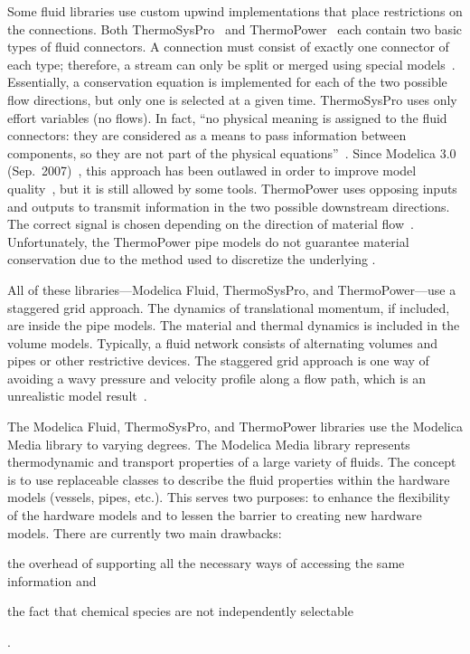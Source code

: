 Some  fluid libraries use custom upwind implementations that place restrictions on the connections.  Both ThermoSysPro~\cite{Hefni2011} and ThermoPower~\cite{Casella2006} each contain two basic types of fluid connectors.  A connection must consist of exactly one connector of each type; therefore, a stream can only be split or merged using special models~\cite{Franke2009}.  Essentially, a conservation equation is implemented for each of the two possible flow directions, but only one is selected at a given time.  ThermoSysPro uses only effort variables (no flows).  In fact, ``no physical meaning is assigned to the fluid connectors: they are considered as a means to pass information between components, so they are not part of the physical equations''~\cite{Hefni2011}.  Since Modelica 3.0 (Sep.\ 2007)~\cite{Modelica3.3}, this approach has been outlawed in order to improve model quality~\cite{Olsson2008}, but it is still allowed by some tools.  %
ThermoPower uses opposing inputs and outputs to transmit information in the two possible downstream directions.  The correct signal is chosen depending on the direction of material flow~\cite{Casella2006, Franke2009}.  Unfortunately, the ThermoPower pipe models do not guarantee material conservation due to the method used to discretize the underlying .

All of these libraries---Modelica Fluid, ThermoSysPro, and ThermoPower---use a staggered grid approach.  The dynamics of translational momentum, if included, are inside the pipe models.  The material and thermal dynamics is included in the volume models.  Typically, a fluid network consists of alternating volumes and pipes or other restrictive devices.  The staggered grid approach is one way of avoiding a wavy pressure and velocity profile along a flow path, which is an unrealistic model result~\cite{Patankar1980}.

The Modelica Fluid, ThermoSysPro, and ThermoPower libraries use the Modelica Media library to varying degrees.  The Modelica Media library represents thermodynamic and transport properties of a large variety of fluids.  The concept is to use replaceable classes to describe the fluid properties within the hardware models (vessels, pipes, etc.).  This serves two purposes: to enhance the flexibility of the hardware models and to lessen the barrier to creating new hardware models.  There are currently two main drawbacks:  \begin{inparaenum}[(1)] \item the overhead of supporting all the necessary ways of accessing the same information and \item the fact that chemical species are not independently selectable\end{inparaenum}.

